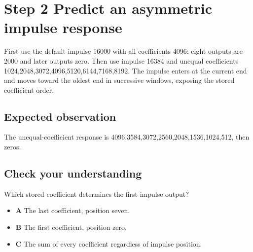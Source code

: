 \section{Step 2 Predict an asymmetric impulse response}\label{fir-s02}

First use the default impulse 16000 with all coefficients 4096: eight outputs are 2000 and later outputs zero. Then use impulse 16384 and unequal coefficients 1024,2048,3072,4096,5120,6144,7168,8192. The impulse enters at the current end and moves toward the oldest end in successive windows, exposing the stored coefficient order.

\subsection{Expected observation}
The unequal-coefficient response is 4096,3584,3072,2560,2048,1536,1024,512, then zeros.

\subsection{Check your understanding}
Which stored coefficient determines the first impulse output?

\begin{itemize}
  \item \textbf{A} The last coefficient, position seven.
  \item \textbf{B} The first coefficient, position zero.
  \item \textbf{C} The sum of every coefficient regardless of impulse position.
\end{itemize}
